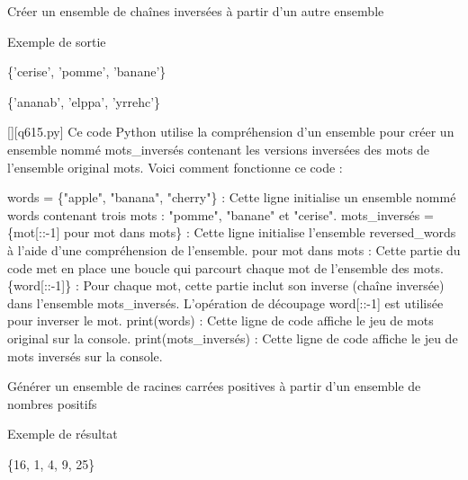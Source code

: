         \question
        Créer un ensemble de chaînes inversées à partir d'un autre ensemble

Exemple de sortie

\{'cerise', 'pomme', 'banane'\}

\{'ananab', 'elppa', 'yrrehc'\}
        \par
        \begin{solution}
            \renewcommand{\nomfichier}{q615.py}
            \pythonfile{\chemincode \nomfichier}[][\nomfichier]
            Ce code Python utilise la compréhension d'un ensemble pour créer un ensemble nommé mots\_inversés contenant les versions inversées des mots de l'ensemble original mots. Voici comment fonctionne ce code :

    words = \{"apple", "banana", "cherry"\} : Cette ligne initialise un ensemble nommé words contenant trois mots : "pomme", "banane" et "cerise".
    mots\_inversés = \{mot[::-1] pour mot dans mots\} : Cette ligne initialise l'ensemble reversed\_words à l'aide d'une compréhension de l'ensemble.
        pour mot dans mots : Cette partie du code met en place une boucle qui parcourt chaque mot de l'ensemble des mots.
        \{word[::-1]\} : Pour chaque mot, cette partie inclut son inverse (chaîne inversée) dans l'ensemble mots\_inversés. L'opération de découpage word[::-1] est utilisée pour inverser le mot.
    print(words) : Cette ligne de code affiche le jeu de mots original sur la console.
    print(mots\_inversés) : Cette ligne de code affiche le jeu de mots inversés sur la console.
        \end{solution}
        

        \question
        Générer un ensemble de racines carrées positives à partir d'un ensemble de nombres positifs

Exemple de résultat

\{16, 1, 4, 9, 25\}

